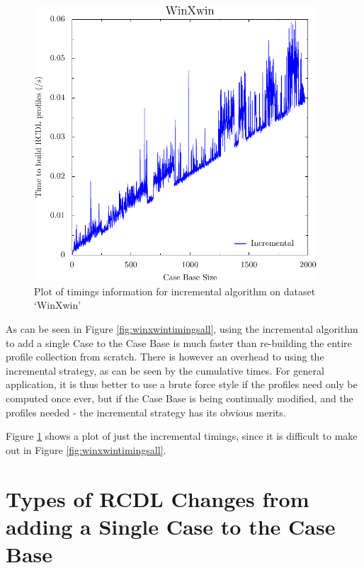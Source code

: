 \documentclass[a4paper,11pt]{report}
\begin{document}
\begin{figure}[h!] 
\centering
\includegraphics[width=300pt]{./ExperimentResults/WinXwin_timings_incr_only}
\caption{Plot of timings information for incremental algorithm on dataset `WinXwin'}
\label{fig:winxwintimingsincronly}
\end{figure}

\begin{samepage}
As can be seen in Figure \ref{fig:winxwintimingsall}, using the incremental algorithm to add a single Case to the Case Base is much faster than re-building the entire profile collection from scratch. There is however an overhead to using the incremental strategy, as can be seen by the cumulative times. For general application, it is thus better to use a brute force style if the profiles need only be computed once ever, but if the Case Base is being continually modified, and the profiles needed - the incremental strategy has its obvious merits.

Figure \ref{fig:winxwintimingsincronly} shows a plot of just the incremental timings, since it is difficult to make out in Figure \ref{fig:winxwintimingsall}.
\end{samepage}


\section{Types of RCDL Changes from adding a Single Case to the Case Base}
\end{document}

